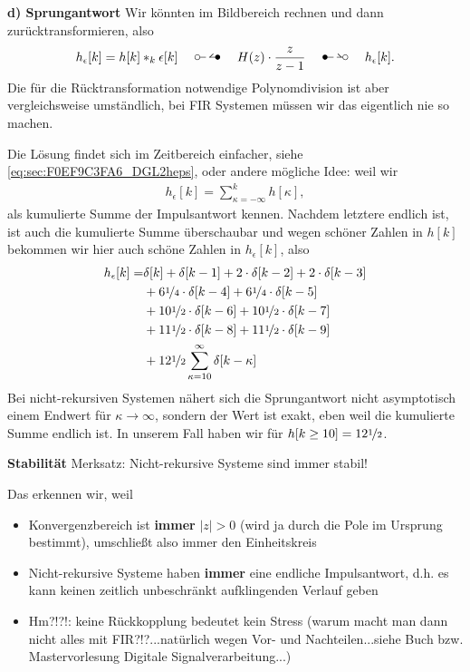 \begin{ExCalc}
\textbf{d) Sprungantwort}
Wir könnten im Bildbereich rechnen und dann zurücktransformieren, also
\begin{align}
h_\epsilon[k] = h[k]\ast_k \epsilon[k] \quad\ztransf\quad
H(z) \cdot \frac{z}{z-1} \quad\Ztransf\quad h_\epsilon[k].
\end{align}
Die für die Rücktransformation notwendige Polynomdivision ist aber
vergleichsweise umständlich, bei FIR Systemen müssen wir das eigentlich nie so
machen.



%
Die Lösung findet sich im Zeitbereich einfacher, siehe \eqref{eq:sec:F0EF9C3FA6_DGL2heps},
oder andere mögliche Idee: weil wir
\begin{align}
h_\epsilon[k] = \sum_{\kappa=-\infty}^{k} h[\kappa],
\end{align}
als kumulierte Summe der Impulsantwort kennen. Nachdem letztere endlich ist,
ist auch die kumulierte Summe überschaubar und wegen schöner Zahlen in $h[k]$
bekommen wir hier auch schöne Zahlen in $h_\epsilon[k]$, also
\begin{align}
h_\epsilon[k] =
&\delta[k]
+\delta[k-1]
+2\cdot\delta[k-2]
+2\cdot\delta[k-3]\nonumber\\
&+6\nicefrac{1}{4}\cdot\delta[k-4]
+6\nicefrac{1}{4}\cdot\delta[k-5]\nonumber\\
&+10\nicefrac{1}{2}\cdot\delta[k-6]
+10\nicefrac{1}{2}\cdot\delta[k-7]\nonumber\\
&+11\nicefrac{1}{2}\cdot\delta[k-8]
+11\nicefrac{1}{2}\cdot\delta[k-9]\nonumber\\
&+12\nicefrac{1}{2}\sum_{\kappa=10}^{\infty}\delta[k-\kappa]
\end{align}
Bei nicht-rekursiven Systemen nähert sich die Sprungantwort nicht
asymptotisch einem Endwert für $\kappa\to\infty$, sondern der Wert ist exakt,
eben weil die kumulierte Summe endlich ist. In unserem Fall haben wir für
$h[k\geq 10] = 12\nicefrac{1}{2}$.

\textbf{Stabilität}
Merksatz: Nicht-rekursive Systeme sind immer stabil!

Das erkennen wir, weil
\begin{itemize}
  \item Konvergenzbereich ist \textbf{immer} $|z|>0$ (wird ja durch die Pole im Ursprung bestimmt), umschließt also immer den Einheitskreis
  \item Nicht-rekursive Systeme haben \textbf{immer} eine endliche Impulsantwort, d.h. es kann keinen zeitlich unbeschränkt aufklingenden Verlauf geben
  \item Hm?!?!: keine Rückkopplung bedeutet kein Stress (warum macht man dann nicht alles mit FIR?!?...natürlich wegen Vor- und Nachteilen...siehe Buch bzw. Mastervorlesung Digitale Signalverarbeitung...)
\end{itemize}



\end{ExCalc}
\begin{Loesung}
\end{Loesung}

